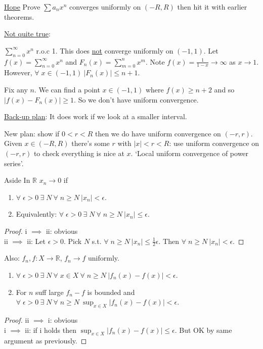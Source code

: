 \underline{Hope} Prove $\sum a_n x^n$ converges uniformly on $(-R, R)$ then hit it with earlier theorems.

\underline{Not quite true}:
\begin{example}
    $\sum_{n=0}^{\infty} x^n$ r.o.c 1.
    This does \underline{not} converge uniformly on $(-1, 1)$.
    Let $f(x) = \sum_{n=0}^{\infty} x^n$ and $F_n(x) = \sum_{m=0}^{n} x^m$.
    Note $f(x) = \frac{1}{1 - x} \to \infty$ as $x \to 1$.
    However, $\forall \; x \in (-1, 1) \ |F_n(x)| \leq n + 1$.

    Fix any $n$.
    We can find a point $x \in (-1, 1)$ where $f(x) \geq n + 2$ and so $|f(x) - F_n(x)| \geq 1$.
    So we don't have uniform convergence. 
\end{example} 

\underline{Back-up plan}: It does work if we look at a smaller interval.

New plan: show if $0 < r < R$ then we do have uniform convergence on $(-r, r)$. \\
Given $x \in (-R, R)$ there's some $r$ with $|x| < r < R$: use uniform convergence on $(-r, r)$ to check everything is nice at $x$.
`Local uniform convergence of power series'.

\begin{aside}{Aside}
    In $\mathbb{R}$ $x_n \to 0$ if 
    \begin{enumerate}
        \item $\forall \; \epsilon > 0 \ \exists \; N \ \forall \; n \geq N \ |x_n| < \epsilon$.
        \item Equivalently: $\forall \; \epsilon > 0 \ \exists \; N \ \forall \; n \geq N \ |x_n| \leq \epsilon$.
    \end{enumerate} 
    \begin{proof}
        i $\implies$ ii: obvious \\
        ii $\implies$ ii: Let $\epsilon > 0$.
        Pick $N$ s.t. $\forall \; n \geq N \ |x_n|  \leq \frac{1}{2} \epsilon$.
        Then $\forall \; n \geq N \ |x_n| < \epsilon$.
    \end{proof} 


    Also: $f_n,f : X \to \mathbb{R}$, $f_n \to f$ uniformly.
    \begin{enumerate}
        \item $\forall \; \epsilon > 0\ \exists \; N\ \forall \; x \in X\ \forall \; n \geq N\ |f_n(x) - f(x)| < \epsilon$.
        \item For $n$ suff large $f_n - f$ is bounded and $\forall \; \epsilon > 0\ \exists \; N\ \forall \; n \geq N\ \sup_{x \in X} |f_n(x) - f(x)| < \epsilon$. 
    \end{enumerate} 
    \begin{proof}
        ii $\implies$ i: obvious \\
        i $\implies$ ii: if i holds then $\sup_{x \in X} |f_n(x) - f(x)| \leq \epsilon$.
        But OK by same argument as previously.
    \end{proof} 
\end{aside} 

